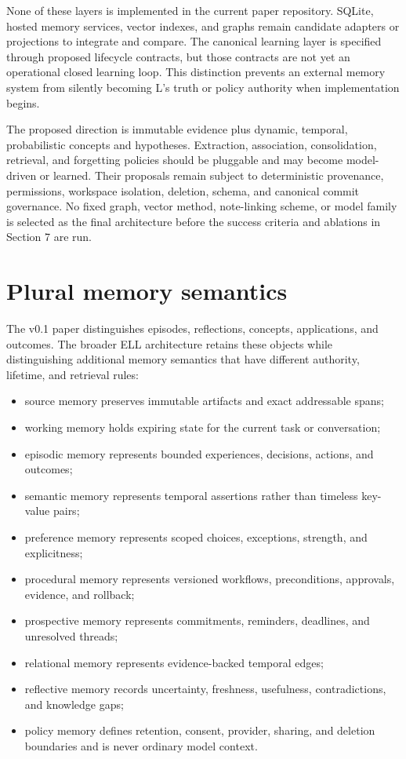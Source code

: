 \documentclass[
  english,
  a4paper,
  DIV=11,
  numbers=noendperiod]{scrreprt}
\providecommand{\tightlist}{%
  \setlength{\itemsep}{0pt}\setlength{\parskip}{0pt}}
\begin{document}
None of these layers is implemented in the current paper repository.
SQLite, hosted memory services, vector indexes, and graphs remain
candidate adapters or projections to integrate and compare. The
canonical learning layer is specified through proposed lifecycle
contracts, but those contracts are not yet an operational closed
learning loop. This distinction prevents an external memory system from
silently becoming L's truth or policy authority when implementation
begins.

The proposed direction is immutable evidence plus dynamic, temporal,
probabilistic concepts and hypotheses. Extraction, association,
consolidation, retrieval, and forgetting policies should be pluggable
and may become model-driven or learned. Their proposals remain subject
to deterministic provenance, permissions, workspace isolation, deletion,
schema, and canonical commit governance. No fixed graph, vector method,
note-linking scheme, or model family is selected as the final
architecture before the success criteria and ablations in Section 7 are
run.

\section{Plural memory semantics}\label{plural-memory-semantics}

The v0.1 paper distinguishes episodes, reflections, concepts,
applications, and outcomes. The broader ELL architecture retains these
objects while distinguishing additional memory semantics that have
different authority, lifetime, and retrieval rules:

\begin{itemize}
\tightlist
\item
  source memory preserves immutable artifacts and exact addressable
  spans;
\item
  working memory holds expiring state for the current task or
  conversation;
\item
  episodic memory represents bounded experiences, decisions, actions,
  and outcomes;
\item
  semantic memory represents temporal assertions rather than timeless
  key-value pairs;
\item
  preference memory represents scoped choices, exceptions, strength, and
  explicitness;
\item
  procedural memory represents versioned workflows, preconditions,
  approvals, evidence, and rollback;
\item
  prospective memory represents commitments, reminders, deadlines, and
  unresolved threads;
\item
  relational memory represents evidence-backed temporal edges;
\item
  reflective memory records uncertainty, freshness, usefulness,
  contradictions, and knowledge gaps;
\item
  policy memory defines retention, consent, provider, sharing, and
  deletion boundaries and is never ordinary model context.
\end{itemize}
\end{document}
